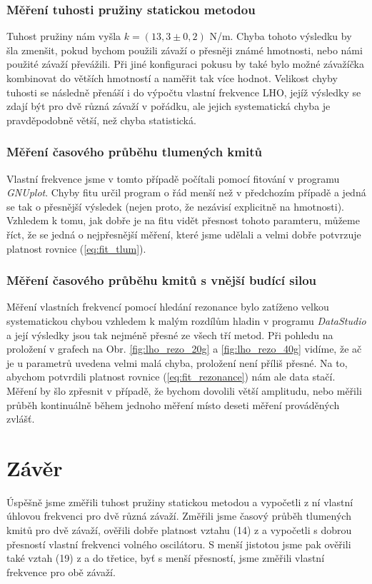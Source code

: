 \documentclass[english]{article}
\begin{document}
	\subsubsection{Měření tuhosti pružiny statickou metodou}
		Tuhost pružiny nám vyšla $k=(13,3\pm0,2)$ N/m. Chyba tohoto výsledku by šla zmenšit, pokud bychom použili závaží o přesněji známé hmotnosti, nebo námi použité závaží převážili. Při jiné konfiguraci pokusu by také bylo možné závažíčka kombinovat do větších hmotností a naměřit tak více hodnot. Velikost chyby tuhosti se následně přenáší i do výpočtu vlastní frekvence LHO, jejíž výsledky se zdají být pro dvě různá závaží v pořádku, ale jejich systematická chyba je pravděpodobně větší, než chyba statistická. 
	\subsubsection{Měření časového průběhu tlumených kmitů}
		Vlastní frekvence jsme v tomto případě počítali pomocí fitování v programu \emph{GNUplot}. Chyby fitu určil program o řád menší než v předchozím případě a jedná se tak o přesnější výsledek (nejen proto, že nezávisí explicitně na hmotnosti). Vzhledem k tomu, jak dobře je na fitu vidět přesnost tohoto paramteru, můžeme říct, že se jedná o nejpřesnější měření, které jsme udělali a velmi dobře potvrzuje platnost rovnice (\ref{eq:fit_tlum}).
	\subsubsection{Měření časového průběhu kmitů s vnější budící silou}
		Měření vlastních frekvencí pomocí hledání rezonance bylo zatíženo velkou systematickou chybou vzhledem k malým rozdílům hladin v programu \emph{DataStudio} a její výsledky jsou tak nejméně přesné ze všech tří metod. Při pohledu na proložení v grafech na Obr. \ref{fig:lho_rezo_20g} a \ref{fig:lho_rezo_40g} vidíme, že ač je u parametrů uvedena velmi malá chyba, proložení není příliš přesné. Na to, abychom potvrdili platnost rovnice (\ref{eq:fit_rezonance}) nám ale data stačí. Měření by šlo zpřesnit v případě, že bychom dovolili větší amplitudu, nebo měřili průběh kontinuálně během jednoho měření místo deseti měření prováděných zvlášť.
		
\section{Závěr}
	Úspěšně jsme změřili tuhost pružiny statickou metodou a vypočetli z ní vlastní úhlovou frekvenci pro dvě různá závaží. Změřili jsme časový průběh tlumených kmitů pro dvě závaží, ověřili dobře platnost vztahu (14) z \cite{bib:zadani_1} a vypočetli s dobrou přesností vlastní frekvenci volného oscilátoru. S menší jistotou jsme pak ověřili také vztah (19) z \cite{bib:zadani_1} a do třetice, byť s menší přesností, jsme změřili vlastní frekvence pro obě závaží.
\end{document}
